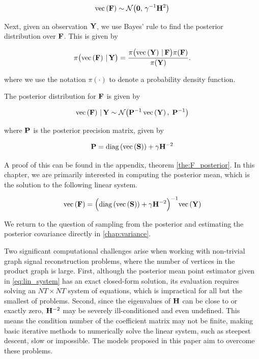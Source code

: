 \begin{equation}
    \label{eq:F_prior}
    \text{\textup{vec}}\left(\mathbf{F}\right) \sim \mathcal{N}\big(\mathbf{0}, \, \gamma^{-1} \mathbf{H}^2\big)
\end{equation}

Next, given an observation $\mathbf{Y}$, we use Bayes' rule to find the posterior distribution over $\mathbf{F}$. This is given by

\begin{equation}
    \pi\big(\text{\textup{vec}}\left(\mathbf{F}\right) \, | \, \mathbf{Y} \big) = \frac{\pi\big(\text{\textup{vec}}\left(\mathbf{Y}\right) \, | \, \mathbf{F} \big) \pi(\mathbf{F}) }{\pi(\mathbf{Y})}.
\end{equation}

where we use the notation $\pi(\cdot)$ to denote a probability density function.

The posterior distribution for $\mathbf{F}$ is given by

\begin{equation}
    \label{eq:F_post_gsr}
    \text{\textup{vec}}\left(\mathbf{F}\right) \, | \, \mathbf{Y} \sim \mathcal{N} \big(\mathbf{P}^{-1} \, \text{\textup{vec}}\left(\mathbf{Y}\right), \; \mathbf{P}^{-1} \big)
\end{equation}

\noindent where $\mathbf{P}$ is the posterior precision matrix, given by 

\begin{equation}
    \label{eq:P_post_gsr}
    \mathbf{P} = \text{\textup{diag}}\left(\text{\textup{vec}}\left(\mathbf{S}\right)\right) + \gamma  \mathbf{H}^{-2}
\end{equation}

A proof of this can be found in the appendix, theorem \ref{the:F_posterior}. In this chapter, we are primarily interested in computing the posterior mean, which is the solution to the following linear system.

\begin{equation}
    \label{eq:lin_system}
    \text{\textup{vec}}\left(\mathbf{F}\right) = \Big(\text{\textup{diag}}\left(\text{\textup{vec}}\left(\mathbf{S}\right)\right) + \gamma  \mathbf{H}^{-2}\Big)^{-1} \text{\textup{vec}}\left(\mathbf{Y}\right)
\end{equation}

We return to the question of sampling from the posterior and estimating the posterior covariance directly in \cref{chap:variance}.

Two significant computational challenges arise when working with non-trivial graph signal reconstruction problems, where the number of vertices in the product graph is large. First, although the posterior mean point estimator given in \cref{eq:lin_system} has an exact closed-form solution, its evaluation requires solving an $NT \times NT$ system of equations, which is impractical for all but the smallest of problems. Second, since the eigenvalues of $\mathbf{H}$ can be close to or exactly zero, $\mathbf{H}^{-2}$ may be severely ill-conditioned and even undefined. This means the condition number of the coefficient matrix may not be finite, making basic iterative methods to numerically solve the linear system, such as steepest descent, slow or impossible. The models proposed in this paper aim to overcome these problems.


